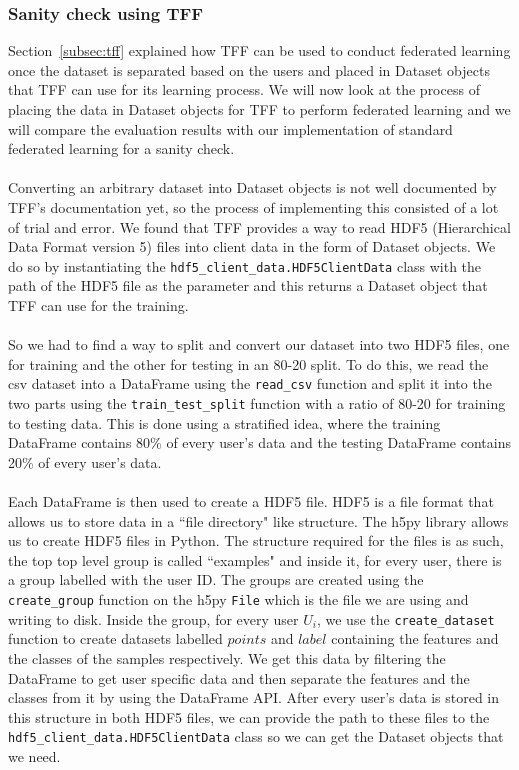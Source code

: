 \documentclass[12pt]{article}
\begin{document}
\subsubsection{Sanity check using TFF}
Section~\ref{subsec:tff} explained how TFF can be used to conduct federated learning once the dataset is separated based on the users and placed in Dataset objects that TFF can use for its learning process. We will now look at the process of placing the data in Dataset objects for TFF to perform federated learning and we will compare the evaluation results with our implementation of standard federated learning for a sanity check. 
\\\\
Converting an arbitrary dataset into Dataset objects is not well documented by TFF's documentation yet, so the process of implementing this consisted of a lot of trial and error. We found that TFF provides a way to read HDF5 (Hierarchical Data Format version 5) files into client data in the form of Dataset objects. We do so by instantiating the \texttt{hdf5\_client\_data.HDF5ClientData} class with the path of the HDF5 file as the parameter and this returns a Dataset object that TFF can use for the training.
\\\\
So we had to find a way to split and convert our dataset into two HDF5 files, one for training and the other for testing in an 80-20 split. To do this, we read the csv dataset into a DataFrame using the \texttt{read\_csv} function and split it into the two parts using the \texttt{train\_test\_split} function with a ratio of 80-20 for training to testing data. This is done using a stratified idea, where the training DataFrame contains 80\% of every user's data and the testing DataFrame contains 20\% of every user's data. 
\\\\
Each DataFrame is then used to create a HDF5 file. HDF5 is a file format that allows us to store data in a ``file directory" like structure. The h5py library allows us to create HDF5 files in Python. The structure required for the files is as such, the top top level group is called ``examples" and inside it, for every user, there is a group labelled with the user ID. The groups are created using the \texttt{create\_group} function on the h5py \texttt{File} which is the file we are using and writing to disk. Inside the group, for every user $U_i$, we use the \texttt{create\_dataset} function to create datasets labelled $points$ and $label$ containing the features and the classes of the samples respectively. We get this data by filtering the DataFrame to get user specific data and then separate the features and the classes from it by using the DataFrame API. After every user's data is stored in this structure in both HDF5 files, we can provide the path to these files to the \texttt{hdf5\_client\_data.HDF5ClientData} class so we can get the Dataset objects that we need.
\end{document}
